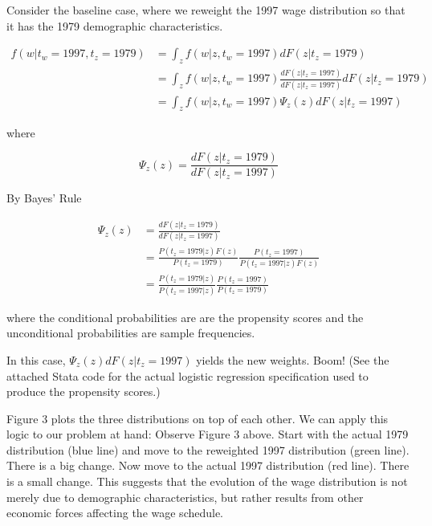 \documentclass[11pt]{article}
\begin{document}

\bigskip Consider the baseline case, where we reweight the 1997 wage distribution so that it has the 1979 demographic characteristics.

\begin{align*}
f(w|t_w=1997,t_z=1979)&=\int_{z} f(w|z,t_w=1997)dF(z|t_z=1979) \\
&=\int_{z} f(w|z,t_w=1997)\frac{dF(z|t_z=1997)}{dF(z|t_z=1997)}dF(z|t_z=1979) \\
&=\int_{z} f(w|z,t_w=1997)\Psi_z(z)dF(z|t_z=1997)
\end{align*}

where

$$ \Psi_z(z) = \frac{dF(z|t_z=1979)}{dF(z|t_z=1997)} $$

By Bayes' Rule

\begin{align*}
\Psi_z(z) &=\frac{dF(z|t_z=1979)}{dF(z|t_z=1997)} \\
&=\frac{P(t_z=1979|z)F(z)}{P(t_z=1979)}\frac{P(t_z=1997)}{P(t_z=1997|z)F(z)} \\
&= \frac{P(t_z=1979|z)}{P(t_z=1997|z)}\frac{P(t_z=1997)}{P(t_z=1979)}
\end{align*}

where the conditional probabilities are are the propensity scores and the unconditional probabilities are sample frequencies.

\bigskip In this case, $\Psi_z(z)dF(z|t_z=1997)$ yields the new weights. Boom! (See the attached Stata code for the actual logistic regression specification used to produce the propensity scores.)

\bigskip Figure 3 plots the three distributions on top of each other. We can apply this logic to our problem at hand: Observe Figure 3 above. Start with the actual 1979 distribution (blue line) and move to the reweighted 1997 distribution (green line). There is a big change. Now move to the actual 1997 distribution (red line). There is a small change. This suggests that the evolution of the wage distribution is not merely due to demographic characteristics, but rather results from other economic forces affecting the wage schedule.
\end{document}
